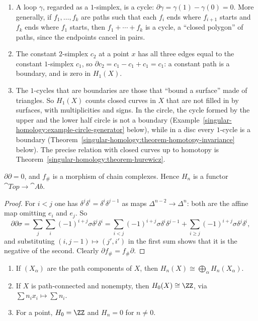 \begin{example}\label{singular-homology:example-cycles}
\begin{enumerate}
\item A loop $\gamma$, regarded as a $1$-simplex, is a cycle: $\partial\gamma = \gamma(1) - \gamma(0) = 0$. More generally, if $f_1, \ldots, f_k$ are paths such that each
$f_i$ ends where $f_{i+1}$ starts and $f_k$ ends where $f_1$ starts, then $f_1 + \cdots + f_k$ is a cycle, a ``closed polygon'' of paths, since the endpoints cancel
in pairs.
\item The constant $2$-simplex $c_2$ at a point $x$ has all three edges equal to the constant $1$-simplex $c_1$, so $\partial c_2 = c_1 - c_1 + c_1 = c_1$: a constant
path is a boundary, and is zero in $H_1(X)$.
\item The $1$-cycles that are boundaries are those that ``bound a surface'' made of triangles. So $H_1(X)$ counts closed curves in $X$ that are not filled in by
surfaces, with multiplicities and signs. In the circle, the cycle formed by the upper and the lower half circle is not a boundary
(Example~\ref{singular-homology:example-circle-generator} below), while in a disc every $1$-cycle is a boundary
(Theorem~\ref{singular-homology:theorem-homotopy-invariance} below). The precise relation with closed curves up to homotopy is
Theorem~\ref{singular-homology:theorem-hurewicz}.
\end{enumerate}
\end{example}

\begin{lemma}\label{singular-homology:lemma-boundary-squared}
$\partial\partial = 0$, and $f_\#$ is a morphism of chain complexes. Hence $H_n$ is a functor $\cat{Top} \to \cat{Ab}$.
\end{lemma}

\begin{proof}
For $i < j$ one has $\delta^j\delta^i = \delta^i\delta^{j-1}$ as maps $\Delta^{n-2} \to \Delta^n$: both are the affine map omitting $e_i$ and $e_j$. So
\[
\partial\partial\sigma = \sum_{j}\sum_{i} (-1)^{i+j}\sigma\delta^j\delta^i
= \sum_{i < j} (-1)^{i+j}\sigma\delta^i\delta^{j-1} + \sum_{i \geq j}(-1)^{i+j}\sigma\delta^j\delta^i,
\]
and substituting $(i, j - 1) \mapsto (j', i')$ in the first sum shows that it is the negative of the second. Clearly $\partial f_\# = f_\#\partial$.
\end{proof}

\begin{proposition}\label{singular-homology:proposition-h0-point}
\begin{enumerate}
\item If $(X_\alpha)$ are the path components of $X$, then $H_n(X) \cong \bigoplus_\alpha H_n(X_\alpha)$.
\item If $X$ is path-connected and nonempty, then $H_0(X) \cong \ZZ$, via $\sum n_ix_i \mapsto \sum n_i$.
\item For a point, $H_0 = \ZZ$ and $H_n = 0$ for $n \neq 0$.
\end{enumerate}
\end{proposition}

